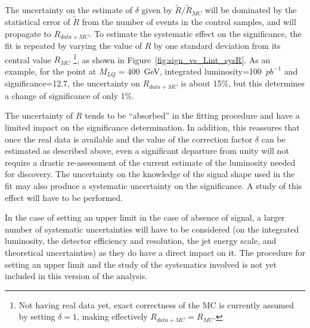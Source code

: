 \documentclass{cmspaper}
\begin{document}
\begin{linenumbers}
The uncertainty on the estimate of $\delta$ given by $\tilde{R}/\tilde{R}_{MC}$ will be 
dominated by the statistical error of $\tilde{R}$ from the number of events in the control samples, and will propagate to $R_{data+MC}$. 
To estimate the systematic effect on the significance, the fit is repeated by varying the 
value of $R$ by one standard deviation from its central value 
$R_{MC}$ \footnote{Not having real data yet, 
exact correctness of the MC is currently assumed by setting $\delta=1$, 
making effectively $R_{data+MC}=R_{MC}$.}, as shown in 
Figure~\ref{fig:sign_vs_Lint_sysR}.
As an example, for the point at $M_{LQ}=400$~GeV, integrated luminosity=100~$pb^{-1}$ and significance=12.7, 
the uncertainty on $R_{data+MC}$ is about 15\%, but this determines a change of 
significance of only 1\%.

The uncertainty 
of $R$ tends to be ``absorbed'' in the fitting procedure and have a limited impact on the 
significance determination.
In addition, this reassures that once the real data is available and the value of the correction 
factor $\delta$ can be estimated as described above,
even a significant departure from unity will not require a drastic re-assessment of
the current estimate of the luminosity needed for discovery.
The uncertainty on the knowledge of the signal shape used in the fit may also produce a systematic
uncertainty on the significance. A study of this effect will have to be performed.

In the case of setting an upper limit in the case of absence of signal, a larger number of systematic
uncertainties will have to be considered (on the integrated luminosity, the detector efficiency and resolution, the jet energy scale, and theoretical uncertainties) 
as they do have a direct impact on it. 
The procedure for setting an upper limit and the study of the 
systematics involved is not yet included in this version of the analysis.



\end{linenumbers}
\end{document}
